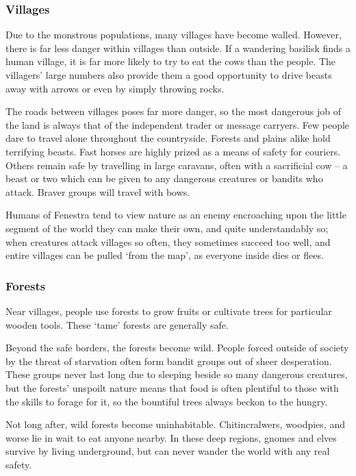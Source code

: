\begin{multicols}{2}
\subsubsection{Villages}

Due to the monstrous populations, many villages have become walled.  However, there is far less danger within villages than outside.  If a wandering basilisk finds a human village, it is far more likely to try to eat the cows than the people.  The villagers' large numbers also provide them a good opportunity to drive beasts away with arrows or even by simply throwing rocks.

The roads between villages poses far more danger, so the most dangerous job of the land is always that of the independent trader or message carryers.  Few people dare to travel alone throughout the countryside.
Forests and plains alike hold terrifying beasts.  Fast horses are highly prized as a means of safety for couriers.  Others remain safe by travelling in large caravans, often with a sacrificial cow -- a beast or two which can be given to any dangerous creatures or bandits who attack.  Braver groups will travel with bows.

Humans of Fenestra tend to view nature as an enemy encroaching upon the little segment of the world they can make their own, and quite understandably so; when creatures attack villages so often, they sometimes succeed too well, and entire villages can be pulled `from the map', as everyone inside dies or flees.

\subsubsection{Forests}

Near villages, people use forests to grow fruits or cultivate trees for particular wooden tools.  These `tame' forests are generally safe.

Beyond the safe borders, the forests become wild.  People forced outside of society by the threat of starvation often form bandit groups out of sheer desperation.  These groups never last long due to sleeping beside so many dangerous creatures, but the forests' unspoilt nature means that food is often plentiful to those with the skills to forage for it, so the bountiful trees always beckon to the hungry.

Not long after, wild forests become uninhabitable.  Chitincralwers, woodpies, and worse lie in wait to eat anyone nearby.  In these deep regions, gnomes and elves survive by living underground, but can never wander the world with any real safety.


\end{multicols}
